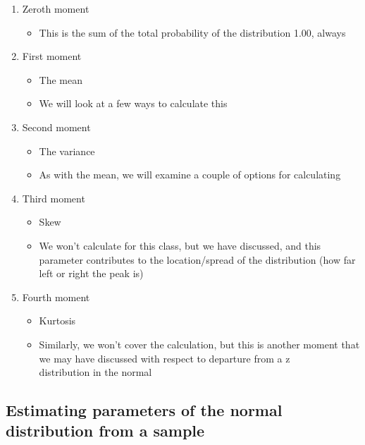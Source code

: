 \documentclass[
]{book}
\providecommand{\tightlist}{%
  \setlength{\itemsep}{0pt}\setlength{\parskip}{0pt}}
\begin{document}
\begin{enumerate}
\def\labelenumi{\arabic{enumi}.}
\tightlist
\item
  Zeroth moment

  \begin{itemize}
  \tightlist
  \item
    This is the sum of the total probability of the distribution 1.00, always
  \end{itemize}
\item
  First moment

  \begin{itemize}
  \tightlist
  \item
    The mean
  \item
    We will look at a few ways to calculate this
  \end{itemize}
\item
  Second moment

  \begin{itemize}
  \tightlist
  \item
    The variance
  \item
    As with the mean, we will examine a couple of options for calculating
  \end{itemize}
\item
  Third moment

  \begin{itemize}
  \tightlist
  \item
    Skew
  \item
    We won't calculate for this class, but we have discussed, and this
    parameter contributes to the location/spread of the distribution (how
    far left or right the peak is)
  \end{itemize}
\item
  Fourth moment

  \begin{itemize}
  \tightlist
  \item
    Kurtosis
  \item
    Similarly, we won't cover the calculation, but this is another moment
    that we may have discussed with respect to departure from a z\\
    distribution in the normal
  \end{itemize}
\end{enumerate}

\hypertarget{estimating-parameters-of-the-normal-distribution-from-a-sample}{%
\subsection{Estimating parameters of the normal distribution from a sample}\label{estimating-parameters-of-the-normal-distribution-from-a-sample}}
\end{document}
